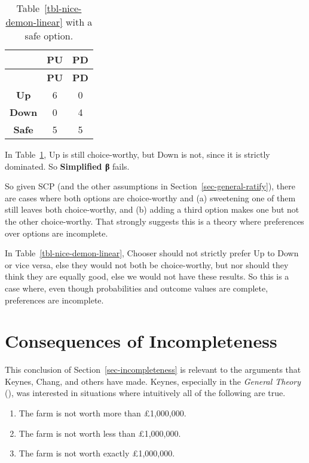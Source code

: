 \documentclass[
  10pt,
  letterpaper,
  DIV=11,
  numbers=noendperiod,
  twoside]{scrartcl}
\providecommand{\tightlist}{%
  \setlength{\itemsep}{0pt}\setlength{\parskip}{0pt}}\usepackage{longtable,booktabs,array}
\begin{document}
\begin{longtable}[]{@{}ccc@{}}
\caption{Table~\ref{tbl-nice-demon-linear} with a safe
option.}\label{tbl-nice-demon-safe}\tabularnewline
\toprule\noalign{}
& \textbf{PU} & \textbf{PD} \\
\midrule\noalign{}
\endfirsthead
\toprule\noalign{}
& \textbf{PU} & \textbf{PD} \\
\midrule\noalign{}
\endhead
\bottomrule\noalign{}
\endlastfoot
\textbf{Up} & 6 & 0 \\
\textbf{Down} & 0 & 4 \\
\textbf{Safe} & 5 & 5 \\
\end{longtable}

In Table~\ref{tbl-nice-demon-safe}, Up is still choice-worthy, but Down
is not, since it is strictly dominated. So \textbf{Simplified β} fails.

So given SCP (and the other assumptions in
Section~\ref{sec-general-ratify}), there are cases where both options
are choice-worthy and (a) sweetening one of them still leaves both
choice-worthy, and (b) adding a third option makes one but not the other
choice-worthy. That strongly suggests this is a theory where preferences
over options are incomplete.

In Table~\ref{tbl-nice-demon-linear}, Chooser should not strictly prefer
Up to Down or vice versa, else they would not both be choice-worthy, but
nor should they think they are equally good, else we would not have
these results. So this is a case where, even though probabilities and
outcome values are complete, preferences are incomplete.

\section{Consequences of
Incompleteness}\label{consequences-of-incompleteness}

This conclusion of Section~\ref{sec-incompleteness} is relevant to the
arguments that Keynes, Chang, and others have made. Keynes, especially
in the \emph{General Theory} (),
was interested in situations where intuitively all of the following are
true.

\begin{enumerate}
\def\labelenumi{\arabic{enumi}.}
\tightlist
\item
  The farm is not worth more than £1,000,000.
\item
  The farm is not worth less than £1,000,000.
\item
  The farm is not worth exactly £1,000,000.
\end{enumerate}
\end{document}
